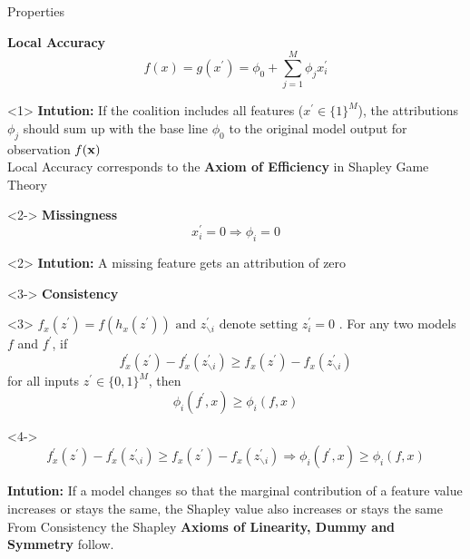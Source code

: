 \documentclass[11pt,compress,t,notes=noshow, aspectratio=169, xcolor=table]{beamer}
\begin{document}
\begin{vbframe}{Properties}

\textbf{Local Accuracy}
$$
f(x)=g\left(x^{\prime}\right)=\phi_{0}+\sum_{j=1}^{M} \phi_{j} x_{i}^{\prime}
$$
\begin{onlyenv}<1>
\textbf{Intution:} If the coalition includes all features ($x^{\prime}  \in \{1\}^M $), the attributions $\phi_j$ should sum up with the base line $\phi_0$ to the original model output for observation $f(\xv)$ \\
Local Accuracy corresponds to the \textbf{Axiom of Efficiency} in Shapley Game Theory 

\end{onlyenv}

\begin{onlyenv}<2->
\textbf{Missingness}
$$
x_{i}^{\prime}=0 \Longrightarrow \phi_{i}=0
$$
\end{onlyenv}

\begin{onlyenv}<2>
\textbf{Intution:}  A missing feature gets an attribution of zero
\end{onlyenv}

\begin{onlyenv}<3->
\textbf{Consistency} \\
\end{onlyenv}
\begin{onlyenv}<3>
$f_{x}\left(z^{\prime}\right)=f\left(h_{x}\left(z^{\prime}\right)\right) \text { and } z^{\prime}_{\backslash  i} \text{ denote setting } z_{i}^{\prime}=0$ . For any two
models $f$ and $f^{\prime}$, if
$$
f_{x}^{\prime}\left(z^{\prime}\right)-f_{x}^{\prime}\left(z^{\prime}_{\backslash i}\right) \geq f_{x}\left(z^{\prime}\right)-f_{x}\left(z^{\prime}_{\backslash i}\right)
$$
for all inputs $z^{\prime} \in \{0, 1\}^M$, then
$$
\phi_{i}\left(f^{\prime}, x\right) \geq \phi_{i}(f, x)
$$
\end{onlyenv}

\begin{onlyenv}<4->
$$
f_{x}^{\prime}\left(z^{\prime}\right)-f_{x}^{\prime}\left(z^{\prime}_{\backslash i}\right) \geq f_{x}\left(z^{\prime}\right)-f_{x}\left(z^{\prime} _{\backslash i}\right) \Longrightarrow \phi_{i}\left(f^{\prime}, x\right) \geq \phi_{i}(f, x)
$$

\textbf{Intution:} If a model changes so that the marginal contribution of a feature value increases or stays the same, the Shapley value also increases or stays the same\\ 
From Consistency the Shapley \textbf{Axioms of Linearity, Dummy and Symmetry} follow.
\end{onlyenv}


\end{vbframe}
\end{document}
